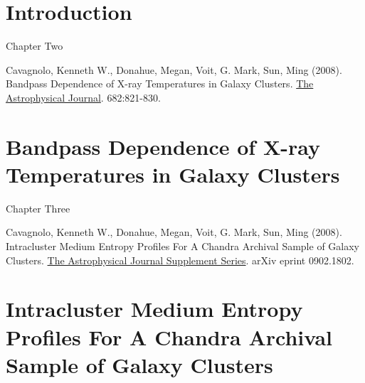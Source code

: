 \documentclass[final]{msuthesis}
\title{\mytitle}
\author{Kenneth W. Cavagnolo}
\begin{document}
\requirements

\chapter{Introduction}
\label{ch:intro}




\newpage
\parbox[c][0.9\textheight][c]{\linewidth}{
\begin{center}
Chapter Two
\end{center}
\begin{spacing}{1.1}
Cavagnolo, Kenneth W., Donahue, Megan, Voit, G. Mark, Sun, Ming
(2008). Bandpass Dependence of X-ray Temperatures in Galaxy
Clusters. {\underline{The Astrophysical Journal}}. 682:821-830.
\end{spacing}
}

\chapter{Bandpass Dependence of X-ray Temperatures in Galaxy Clusters}
\label{ch:eband}




\newpage
\parbox[c][0.9\textheight][c]{\linewidth}{
\begin{center}
Chapter Three
\end{center}
\begin{spacing}{1.1}
Cavagnolo, Kenneth W., Donahue, Megan, Voit, G. Mark, Sun, Ming
(2008). Intracluster Medium Entropy Profiles For A Chandra Archival
Sample of Galaxy Clusters. {\underline{The Astrophysical Journal
Supplement Series}}. arXiv eprint 0902.1802.\\
\end{spacing}
}

\chapter{Intracluster Medium Entropy Profiles For A Chandra Archival Sample of Galaxy Clusters}
\label{ch:ent_supp}
\end{document}

